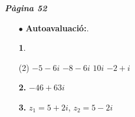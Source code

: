 \documentclass[a4paper, pdf, twoside]{book}
\begin{document}
\begin{multicols}{2}

{\textbf{\em Pàgina 52}} \hrulefill
\begin{enumerate}
\vspace{0.25cm}
 \item[$\bullet$ ] {\selectfont\color{blue}\textbf{Autoavaluació:}. }

 \end{enumerate}
\begin{enumerate}
\vspace{0.25cm}



 \item[\fontfamily{phv}\selectfont\color{blue}\textbf{1}. ]  \scalebox{0.6}{\simbolclau } 
 \begin{tasks}[column-sep=1em, item-indent=1.3333em](2)
	 \task $-5-6i$
	 \task $-8-6i$
	 \task $10i$
	 \task $-2+i$
\end{tasks}
\vspace{0.25cm}
\item[\fontfamily{phv}\selectfont\color{blue}\textbf{2. }]  \scalebox{0.6}{\simbolclau } 
$-46+63i$
\vspace{0.25cm}
\item[\fontfamily{phv}\selectfont\color{blue}\textbf{3. }]  \scalebox{0.6}{\simbolclau } 
$z_1=5+2i$, $z_2=5-2i$
\vspace{0.25cm}




\end{enumerate}
\end{multicols}
\end{document}
